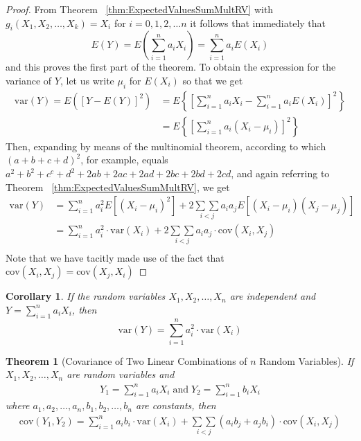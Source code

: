 \documentclass[
10pt,reqno
]{amsart}
\newtheorem{theorem}{Theorem}[section]
\newtheorem{corollary}{Corollary}[section]
\theoremstyle{definition}
\begin{document}
\begin{proof}
From Theorem ~\ref{thm:ExpectedValuesSumMultRV} with \(g_i (X_1, X_2, \ldots, X_k)=X_i\) for \(i=0,1,2, \ldots n \) it follows that immediately that
\[
E(Y)=E \left ( \sum_{i=1}^n a_iX_i \right ) = \sum_{i=1}^n a_i E(X_i)
\]
and this proves the first part of the theorem. To obtain the expression for the variance of \(Y\), let us write \( \mu_i \) for \(E(X_i)\) so that we get
\begin{align*}
\text{var}(Y) = E([Y-E(Y)]^2)&=E \left \{  \left [ \sum_{i=1}^n a_i X_i  - \sum_{i=1}^n a_i E(X_i)\right ]^2 \right \}\\
&=E \left \{  \left [ \sum_{i=1}^n a_i (X_i  - \mu_i)\right ]^2 \right \}
\end{align*}
Then, expanding by means of the multinomial theorem, according to which \((a+b+c+d)^2\), for example, equals \(a^2+b^2+c^c+d^2+2ab+2ac+2ad+2bc+2bd+2cd\), and again referring to Theorem ~\ref{thm:ExpectedValuesSumMultRV}, we get
\begin{align*}
\text{var}(Y) &= \sum_{i=1}^n a_i^2 E[(X_i - \mu_i)^2]+ 2 \underset{i<j}{\sum \sum}a_i a_j E[(X_i - \mu_i)(X_j - \mu_j)]\\
&= \sum_{i=1}^n a_i^2 \cdot \text{var} (X_i)+ 2 \underset{i<j}{\sum \sum}a_i a_j \cdot \text{cov}(X_i,X_j)\\
\end{align*}
Note that we have tacitly made use of the fact that \(\text{cov}(X_i, X_j)=\text{cov}(X_j,X_i)\)
\end{proof}

\begin{corollary}
If the random variables \(X_1, X_2,\ldots,X_n\) are independent and \(Y=\sum_{i=1}^n a_i X_i\), then
\[
\text{var}(Y)=\sum_{i=1}^n a_i^2 \cdot \text{var}(X_i)
\]
\end{corollary}

\begin{theorem}[Covariance of Two Linear Combinations of \(n\) Random Variables]
If \(X_1, X_2,\ldots,X_n\) are random variables and
\begin{align*}
Y_1=\sum_{i=1}^n a_i X_i \; \text{and} \; Y_2=\sum_{i=1}^n b_i X_i
\end{align*}
where \(a_1,a_2,\ldots,a_n,b_1, b_2, \ldots, b_n\) are constants, then
\begin{align*}
\text{cov}(Y_1,Y_2) = \sum_{i=1}^n a_i b_i \cdot \text{var} (X_i)+ \underset{i<j}{\sum \sum}(a_i b_j + a_j b_i) \cdot \text{cov}(X_i,X_j)\\
\end{align*}
\end{theorem}
\end{document}
